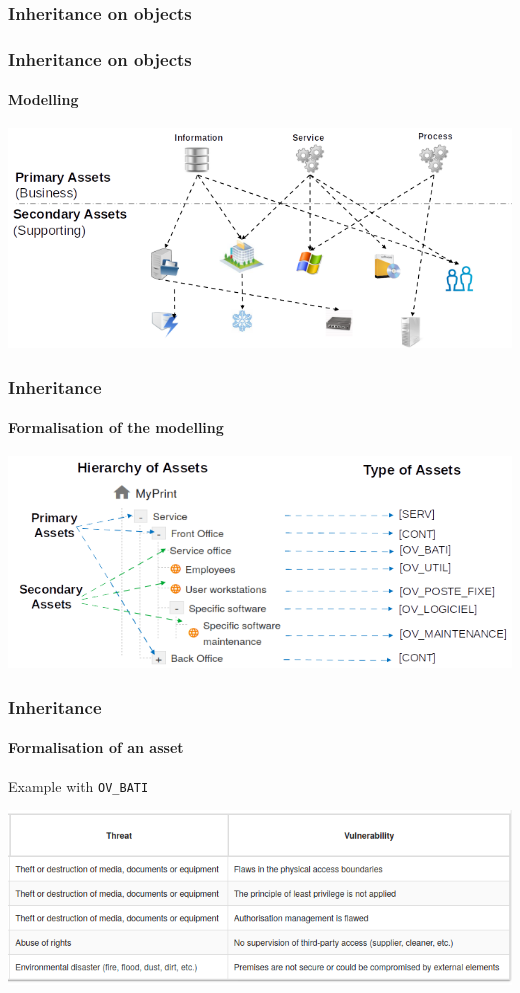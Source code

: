 \subsubsection{Inheritance on objects}
\begin{frame}
    \frametitle{Inheritance on objects}
    \framesubtitle{Modelling}
    \begin{center}
        \includegraphics[scale=0.45]{../common_pictures/MONARC-method-modelling.png}
    \end{center}
\end{frame}

\begin{frame}
    \frametitle{Inheritance}
    \framesubtitle{Formalisation of the modelling}
    \begin{center}
        \includegraphics[scale=0.5]{../common_pictures/MONARC-modelling-formalisation.png}
    \end{center}
\end{frame}

\begin{frame}
    \frametitle{Inheritance}
    \framesubtitle{Formalisation of an asset}
    Example with \texttt{OV\_BATI}
    \begin{center}
        \includegraphics[scale=0.7]{../common_pictures/ov_bati.png}
    \end{center}
\end{frame}

